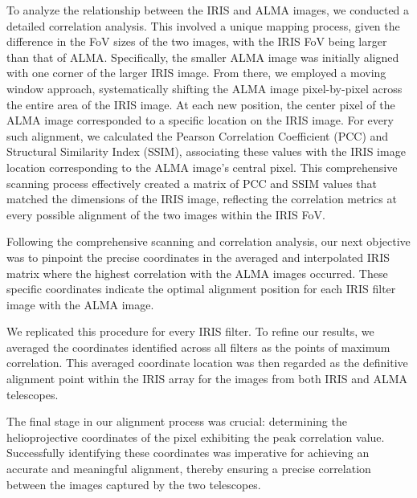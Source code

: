 \documentclass[a4paper,alpha-refs]{eSpectra}
\begin{document}
To analyze the relationship between the IRIS and ALMA images, we conducted a detailed correlation analysis. 
This involved a unique mapping process, given the difference in the FoV sizes of the two images, with the IRIS FoV being larger than that of ALMA. Specifically, the smaller ALMA image was initially aligned with one corner of the larger IRIS image. From there, we employed a moving window approach, systematically shifting the ALMA image pixel-by-pixel across the entire area of the IRIS image.  At each new position, the center pixel of the ALMA image corresponded to a specific location on the IRIS image. For every such alignment, we calculated the Pearson Correlation Coefficient (PCC) and Structural Similarity Index (SSIM), associating these values with the IRIS image location corresponding to the ALMA image's central pixel. This comprehensive scanning process effectively created a matrix of PCC and SSIM values that matched the dimensions of the IRIS image, reflecting the correlation metrics at every possible alignment of the two images within the IRIS FoV.

Following the comprehensive scanning and correlation analysis, our next objective was to pinpoint the precise coordinates in the averaged and interpolated IRIS matrix where the highest correlation with the ALMA images occurred. These specific coordinates indicate the optimal alignment position for each IRIS filter image with the ALMA image.

We replicated this procedure for every IRIS filter. To refine our results, we averaged the coordinates identified across all filters as the points of maximum correlation. This averaged coordinate location was then regarded as the definitive alignment point within the IRIS array for the images from both IRIS and ALMA telescopes.

The final stage in our alignment process was crucial: determining the helioprojective coordinates of the pixel exhibiting the peak correlation value. Successfully identifying these coordinates was imperative for achieving an accurate and meaningful alignment, thereby ensuring a precise correlation between the images captured by the two telescopes.
\end{document}
